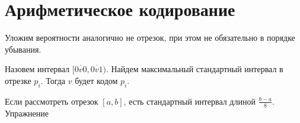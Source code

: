 \section{Арифметическое кодирование}
Уложим вероятности аналогично не отрезок, при этом не обязательно в порядке убывания.

Назовем  интервал $ \bigl[\overline{0 v 0}, \overline{0 v 1}\bigr)$. Найдем максимальный стандартный интервал в отрезке $ p_i$. Тогда $ v$ будет кодом  $ p_i$.

\begin{proof*}
	Если рассмотреть отрезок $ [a, b]$, есть стандартный интервал длиной  $ \frac{b-a}{8}$. Упражнение
\end{proof*}

